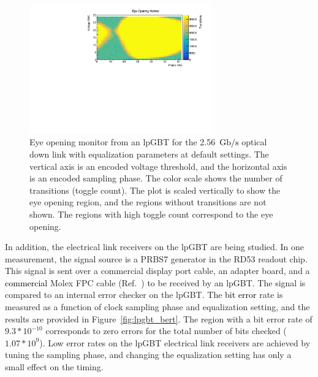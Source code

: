 \documentclass[a4paper,11pt]{article}
\newcommand{\fig}{Figure}
\newcommand{\gbps}{\ensuremath{\mathrm{Gb}/\mathrm{s}}\xspace}
\newcommand{\black}{\textcolor{black}}
\begin{document}
\begin{figure}[htbp]
\centering
\includegraphics[width=0.70\textwidth,origin=c]{../figures/lpGBT_eye.pdf}
\caption{
\label{fig:lpgbt_eye}
Eye opening monitor from an lpGBT for the 2.56~\black{\gbps} optical down link with equalization parameters at default settings.
The vertical axis is an encoded voltage threshold, and the horizontal axis is an encoded sampling phase.
The color scale shows the number of transitions (toggle count).
The plot is scaled vertically to show the eye opening region, and the regions without transitions are not shown.
The regions with high toggle count correspond to the eye opening.
}
\end{figure}


In addition, the electrical link receivers on the lpGBT are being studied.
In one measurement, the signal source is a PRBS7 generator in the RD53 readout chip.
This signal is sent over a commercial display port cable, an adapter board, and a \black{commercial} Molex FPC cable (Ref.~\cite{ref:molex_cable}) to be received by an lpGBT.
The signal is compared to an internal error checker on the lpGBT.
The \black{bit error} rate is measured as a function of clock sampling phase and equalization setting, and the results are provided in \fig~\ref{fig:lpgbt_bert}.
The region with a bit error rate of $9.3 * 10^{-10}$ corresponds to zero errors for the total number of bits checked ($1.07 * 10^{9}$).
Low error rates on the lpGBT electrical link receivers are achieved by tuning the sampling phase, and changing the equalization setting has only a small effect on the timing.
\end{document}
